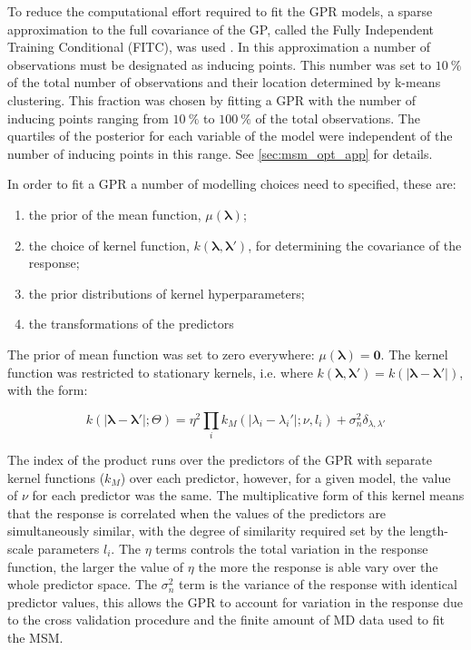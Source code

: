 To reduce the computational effort required to fit the GPR models, a sparse approximation to the full covariance of the GP, called the Fully Independent Training Conditional (FITC), was used \cite{quinonero-candelaUnifyingViewSparse2005}. In this approximation a number of observations must be designated as inducing points. This number was set to $\SI{10}{\percent}$ of the total number of observations and their location determined by k-means clustering. This fraction was chosen by fitting a GPR with the number of inducing points ranging from $\SI{10}{\percent}$ to $\SI{100}{\percent}$ of the total observations. The quartiles of the posterior for each variable of the model were independent of the number of inducing points in this range. See \ref{sec:msm_opt_app} for details. 

In order to fit a GPR a number of modelling choices need to specified, these are: 
\begin{enumerate}
    \item the prior of the mean function, $\mu(\mathbf{\lambda})$;
    \item the choice of kernel function, $k(\mathbf{\lambda}, \mathbf{\lambda}')$, for determining the covariance of the response;
    \item the prior distributions of kernel hyperparameters;
    \item the transformations of the predictors 
\end{enumerate}

The prior of mean function  was set to zero everywhere: $\mu(\mathbf{\lambda})=\mathbf{0}$. The kernel function was restricted to stationary kernels, i.e. where $k(\mathbf{\lambda}, \mathbf{\lambda'}) = k(|\mathbf{\lambda} - \mathbf{\lambda'}|)$, with the form: 

\begin{equation}\label{eqn:kernel_form}
    k(|\mathbf{\lambda}-\mathbf{\lambda}'|; \Theta) = 
    \eta^{2}\prod_i k_{M}(|\lambda_{i}-\lambda_{i}'|; \nu, l_i)
    +\sigma_{n}^{2}\delta_{\lambda, \lambda'}
\end{equation}

The index of the product runs over the predictors of the GPR with separate kernel functions ($k_{M}$) over each predictor, however,  for a given model, the value of $\nu$ for each predictor was the same. The multiplicative form of this kernel means that the response is correlated when the values of the predictors are simultaneously similar, with the degree of similarity required set by the length-scale parameters $l_{i}$.  The $\eta$ terms controls the total variation in the response function, the larger the value of $\eta$ the more the response is able vary over the whole predictor space. The $\sigma_{n}^{2}$ term is the variance of the response with identical predictor values, this allows the GPR to account for variation in the response due to the cross validation procedure and the finite amount of MD data used to fit the MSM. 

